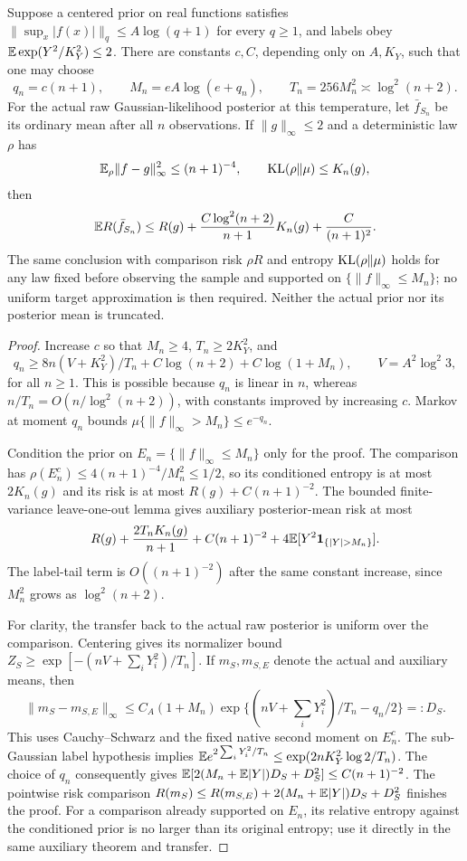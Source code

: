 \begin{theorem}
\label{thm:logmoment-raw-oracle}
Suppose a centered prior on real functions satisfies
$\|\sup_x|f(x)|\|_q\le A\log(q+1)$ for every $q\ge1$,
and labels obey $\mathbb E\exp(Y^2/K_Y^2)\le2$.
There are constants $c,C$, depending only on $A,K_Y$, such that
one may choose
\[
 q_n=c(n+1),\qquad M_n=eA\log(e+q_n),\qquad
 T_n=256M_n^2\asymp\log^2(n+2).
\]
For the actual raw Gaussian-likelihood posterior at this temperature,
let $\bar f_{S_n}$ be its ordinary mean after all $n$ observations.
If $\|g\|_\infty\le2$ and a deterministic law $\rho$ has
\[
 \mathbb E_\rho\|f-g\|_\infty^2\le(n+1)^{-4},\qquad
 \operatorname{KL}(\rho\|\mu)\le K_n(g),
\]
then
\begin{equation}
 \mathbb E R(\bar f_{S_n})
 \le R(g)+\frac{C\log^2(n+2)}{n+1}K_n(g)
                        +\frac C{(n+1)^2}.
 \label{eq:asinh-generic-oracle}
\end{equation}
The same conclusion with comparison risk $\rho R$ and entropy
$\operatorname{KL}(\rho\|\mu)$ holds for any law fixed before observing the sample and supported on
$\{\|f\|_\infty\le M_n\}$; no uniform target approximation is
then required. Neither the actual prior nor its posterior mean is
truncated.
\end{theorem}
\begin{proof}
Increase $c$ so that $M_n\ge4$, $T_n\ge2K_Y^2$, and
\[
 q_n\ge8n(V+K_Y^2)/T_n+C\log(n+2)+C\log(1+M_n),
 \qquad V=A^2\log^2 3,
\]
for all $n\ge1$. This is possible because $q_n$ is linear in $n$,
whereas $n/T_n=O(n/\log^2(n+2))$, with constants improved by
increasing $c$. Markov at moment $q_n$ bounds
$\mu\{\|f\|_\infty>M_n\}\le e^{-q_n}$.

Condition the prior on $E_n=\{\|f\|_\infty\le M_n\}$ only for
the proof. The comparison has $\rho(E_n^c)\le
4(n+1)^{-4}/M_n^2\le1/2$, so its conditioned entropy is at most
$2K_n(g)$ and its risk is at most $R(g)+C(n+1)^{-2}$.
The bounded finite-variance leave-one-out lemma gives auxiliary
posterior-mean risk at most
\[
 R(g)+\frac{2T_nK_n(g)}{n+1}+C(n+1)^{-2}
       +4\E[Y^2\mathbf1_{\{|Y|>M_n\}}].
\]
The label-tail term is $O((n+1)^{-2})$ after the same constant
increase, since $M_n^2$ grows as $\log^2(n+2)$.

For clarity, the transfer back to the actual raw posterior is uniform
over the comparison. Centering gives its normalizer bound
$Z_S\ge\exp[-(nV+\sum_iY_i^2)/T_n]$.
If $m_S,m_{S,E}$ denote the actual and auxiliary means, then
\[
 \|m_S-m_{S,E}\|_\infty
 \le C_A(1+M_n)
 \exp\{(nV+\textstyle\sum_iY_i^2)/T_n-q_n/2\}=:D_S.
\]
This uses Cauchy--Schwarz and the fixed native second moment on
$E_n^c$. The sub-Gaussian label hypothesis implies
$\mathbb E e^{2\sum_iY_i^2/T_n}\le
\exp(2nK_Y^2\log2/T_n)$.
The choice of $q_n$ consequently gives
$\mathbb E[2(M_n+\mathbb E|Y|)D_S+D_S^2]\le C(n+1)^{-2}$.
The pointwise risk comparison
$R(m_S)\le R(m_{S,E})+2(M_n+\mathbb E|Y|)D_S+D_S^2$
finishes the proof.
For a comparison already supported on $E_n$, its relative entropy
against the conditioned prior is no larger than its original entropy;
use it directly in the same auxiliary theorem and transfer.
\end{proof}

